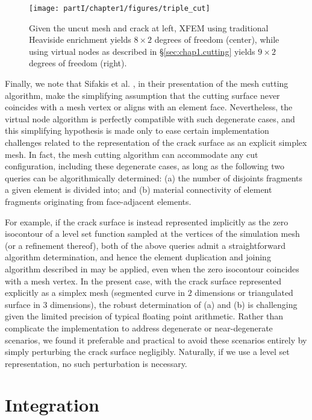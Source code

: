 \setlength{\figurewidth}{\textwidth}
\begin{figure}[htbp]
\centering
\texttt{[image: partI/chapter1/figures/triple\_cut]}
\caption{Given the uncut mesh and crack at left, XFEM using traditional Heaviside enrichment yields $8 \times 2$ degrees of freedom (center), while using virtual nodes as described in \S\ref{sec:chap1.cutting} yields $9 \times 2$ degrees of freedom (right).}
\label{fig:chap1.triplecut}
\end{figure}

Finally, we note that Sifakis et al. \cite{Sifakis07}, in their presentation of the mesh cutting algorithm, make the simplifying assumption that the cutting surface never coincides with a mesh vertex or aligns with an element face. Nevertheless, the virtual node algorithm is perfectly compatible with such degenerate cases, and this simplifying hypothesis is made only to ease certain implementation challenges related to the representation of the crack surface as an explicit simplex mesh. In fact, the mesh cutting algorithm can accommodate any cut configuration, including these degenerate cases, as long as the following two queries can be algorithmically determined: (a) the number of disjoints fragments a given element is divided into; and (b) material connectivity of element fragments originating from face-adjacent elements.

For example, if the crack surface is instead represented implicitly as the zero isocontour of a level set function sampled at the vertices of the simulation mesh (or a refinement thereof), both of the above queries admit a straightforward algorithm determination, and hence the element duplication and joining algorithm described in \cite{Sifakis07} may be applied, even when the zero isocontour coincides with a mesh vertex. In the present case, with the crack surface represented explicitly as a simplex mesh (segmented curve in $2$ dimensions or triangulated surface in $3$ dimensions), the robust determination of (a) and (b) is challenging given the limited precision of typical floating point arithmetic. Rather than complicate the implementation to address degenerate or near-degenerate scenarios, we found it preferable and practical to avoid these scenarios entirely by simply perturbing the crack surface negligibly. Naturally, if we use a level set representation, no such perturbation is necessary.

\section{Integration} \label{sec:chap1.integration}

